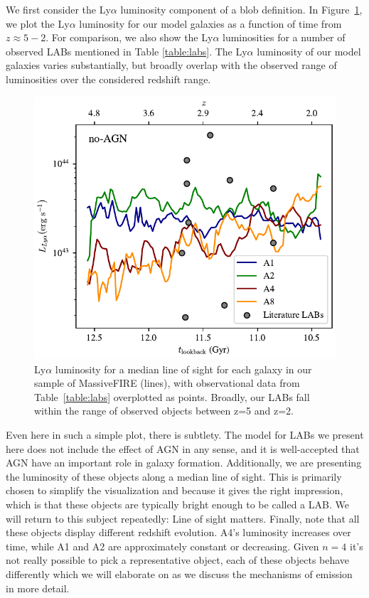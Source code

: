 We first consider the Ly$\alpha$ luminosity component of a blob definition.
In Figure~\ref{fig:luminosity_redshift}, we plot the Ly$\alpha$ luminosity for our model galaxies as a function of time from $z\approx5-2$.
For comparison, we also show the Ly$\alpha$ luminosities for a number of observed LABs mentioned in Table \ref{table:labs}.
The Ly$\alpha$ luminosity of our model galaxies varies substantially, but broadly overlap  with the observed range of luminosities over the considered redshift range.

\begin{figure}
    \centering
    \includegraphics[width=\textwidth,height=\textheight,keepaspectratio]{figures/luminosity_redshift.pdf}
    \caption{
        Ly$\alpha$ luminosity for a median line of sight for each galaxy in our sample of MassiveFIRE (lines), with observational data from Table~\ref{table:labs} overplotted as points.
        Broadly, our LABs fall within the range of observed objects between z=5 and z=2.
    }
    \label{fig:luminosity_redshift}
\end{figure}

Even here in such a simple plot, there is subtlety.
The model for LABs we present here does not include the effect of AGN in any sense, and it is well-accepted that AGN have an important role in galaxy formation.
Additionally, we are presenting the luminosity of these objects along a median line of sight.
This is primarily chosen to simplify the visualization and because it gives the right impression, which is that these objects are typically bright enough to be called a LAB.
We will return to this subject repeatedly: Line of sight matters.
Finally, note that all these objects display different redshift evolution.
A4's luminosity increases over time, while A1 and A2 are approximately constant or decreasing.
Given $n=4$ it's not really possible to pick a representative object, each of these objects behave differently which we will elaborate on as we discuss the mechanisms of emission in more detail.

